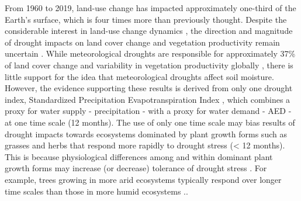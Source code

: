 \documentclass[
  sn-nature,
  numbered]{sn-jnl}
\begin{document}
From 1960 to 2019, land-use change has impacted approximately one-third
of the Earth's surface, which is four times more than previously
thought\citep{Winkler2021}. Despite the considerable interest in
land-use change dynamics \citep[e.g.,][]{Song2018, Winkler2021}, the
direction and magnitude of drought impacts on land cover change and
vegetation productivity remain uncertain
\citep{Chen2022, Akinyemi2021, Peng2017}. While meteorological droughts
are responsible for approximately 37\% of land cover change and
variability in vegetation productivity globally \citep{Peng2017}, there
is little support for the idea that meteorological droughts affect soil
moisture\citep{Chen2022}. However, the evidence supporting these results
is derived from only one drought index, Standardized Precipitation
Evapotranspiration Index \citep[SPEI,][]{Vicente-Serrano2010}, which
combines a proxy for water supply - precipitation - with a proxy for
water demand - AED - at one time scale (12 months). The use of only one
time scale may bias results of drought impacts towards ecosystems
dominated by plant growth forms such as grasses and herbs that respond
more rapidly to drought stress (\textless{} 12 months). This is because
physiological differences among and within dominant plant growth forms
may increase (or decrease) tolerance of drought stress
\citep{Craine2013, McDowell2022}. For example, trees growing in more
arid ecosystems typically respond over longer time scales than those in
more humid ecosystems \citep{Vicente-Serrano2014}..
\end{document}
